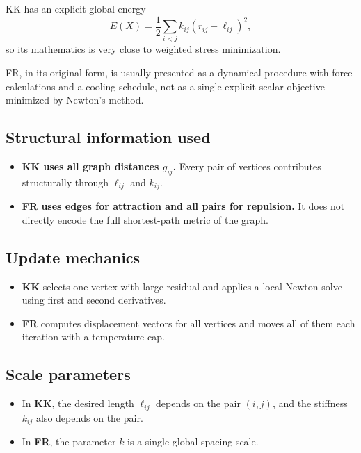 \documentclass[11pt]{article}
\begin{document}
KK has an explicit global energy
\[
E(X) = \frac{1}{2} \sum_{i<j} k_{ij}(r_{ij} - \ell_{ij})^2,
\]
so its mathematics is very close to weighted stress minimization.

FR, in its original form, is usually presented as a dynamical procedure with
force calculations and a cooling schedule, not as a single explicit scalar
objective minimized by Newton's method.

\subsection{Structural information used}

\begin{itemize}[leftmargin=1.5em]
\item \textbf{KK uses all graph distances $g_{ij}$.} Every pair of vertices
contributes structurally through $\ell_{ij}$ and $k_{ij}$.
\item \textbf{FR uses edges for attraction and all pairs for repulsion.} It does
not directly encode the full shortest-path metric of the graph.
\end{itemize}

\subsection{Update mechanics}

\begin{itemize}[leftmargin=1.5em]
\item \textbf{KK} selects one vertex with large residual and applies a local
Newton solve using first and second derivatives.
\item \textbf{FR} computes displacement vectors for all vertices and moves all of
them each iteration with a temperature cap.
\end{itemize}

\subsection{Scale parameters}

\begin{itemize}[leftmargin=1.5em]
\item In \textbf{KK}, the desired length $\ell_{ij}$ depends on the pair $(i,j)$,
and the stiffness $k_{ij}$ also depends on the pair.
\item In \textbf{FR}, the parameter $k$ is a single global spacing scale.
\end{itemize}
\end{document}
